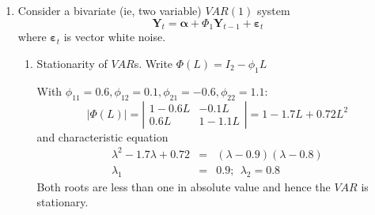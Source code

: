 \documentclass[oneside,openany]{tufte-book} %
\begin{document}
	\begin{enumerate}


\item Consider a bivariate (ie, two variable) $VAR(1)$ system
\[
\bm{Y}_{t}=\bm{\alpha} +\Phi_{1}\bm{Y}_{t-1}+\bm{\varepsilon}_{t}
\]%
where $\bm{\varepsilon }_{t}$ is vector white noise. \medskip

\begin{enumerate}
	\item Stationarity of $VAR$s. Write $\Phi(L)=I_2-\phi_1L$\medskip

	

		 With $\phi _{11}=0.6,\phi _{12}=0.1,\phi _{21}=-0.6,\phi _{22}=1.1:$%
		\[
		\left\vert \Phi (L)\right\vert =\left\vert
		\begin{array}{cc}
		1-0.6L & -0.1L \\
		0.6L & 1-1.1L%
		\end{array}%
		\right\vert =1-1.7L+0.72L^{2}
		\]%
		and characteristic equation%
		\begin{eqnarray*}
			\lambda ^{2}-1.7\lambda +0.72 &=&(\lambda -0.9)(\lambda -0.8) \\
			\lambda _{1} &=&0.9;~~\lambda _{2}=0.8
		\end{eqnarray*}%
		Both roots are less than one in absolute value and hence the $VAR$ is
		stationary.\medskip


\end{enumerate}
\end{enumerate}
\end{document}

